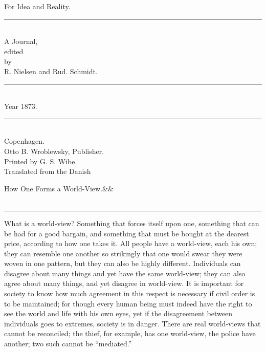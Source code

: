 \documentclass[12pt,a4paper,openany]{book}
\newcommand{\opage}[1]{\marginnote{\footnotesize\textit{[#1]}}}
\newcommand{\essayhead}[2]{\begin{center}{\large #1}\ifx&#2&\else\\[0.3em]{\normalsize #2}\fi\\[0.5em]\rule{3em}{0.4pt}\end{center}\medskip\noindent}
\begin{document}
\begin{titlepage}
\begin{center}
\vspace*{3em}
{\Huge For Idea and Reality.}\\[1em]
\rule{8em}{0.4pt}\\[1em]
{\large A Journal,}\\[0.8em]
{\small edited}\\[0.4em]
{\footnotesize by}\\[0.6em]
{\large R. Nielsen and Rud. Schmidt.}\\[0.4em]
\rule{8em}{0.4pt}\\[0.6em]
{\large Year 1873.}\\[0.6em]
\rule{8em}{0.4pt}\\[4em]
Copenhagen.\\[0.4em]
Otto B. Wroblewsky, Publisher.\\[1.5em]
{\small Printed by G. S. Wibe.}\\[3em]
{\small Translated from the Danish}
\end{center}
\end{titlepage}

\essayhead{How One Forms a World-View.}{}
\setcounter{footnote}{0}%
\opage{1}What is a world-view? Something that forces itself
upon one, something that can be had for a good bargain, and something
that must be bought at the dearest price, according to how one takes
it. All people have a world-view, each his
own; they can resemble one another so strikingly that one
would swear they were woven in one pattern, but they
can also be highly different. Individuals can
disagree about many things and yet have the same world-view;
they can also agree about many things, and yet
disagree in world-view. It is important for society
to know how much agreement in this respect
is necessary if civil order is to be maintained;
for though every human being must indeed have the right to
see the world and life with his own eyes, yet if the disagreement
between individuals goes to extremes, society
is in danger. There are real world-views that
cannot be reconciled; the thief, for example, has one world-view,
the police have another; two such cannot be ``mediated.''
\end{document}

